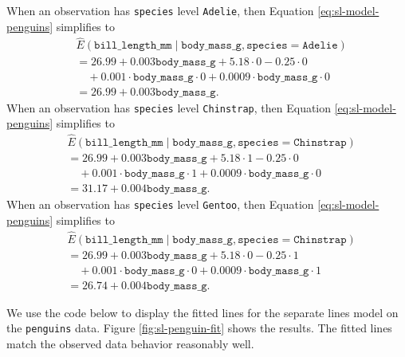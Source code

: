 \documentclass[
]{book}
\theoremstyle{definition}
\theoremstyle{definition}
\theoremstyle{definition}
\theoremstyle{definition}
\theoremstyle{remark}
\begin{document}
When an observation has \texttt{species} level \texttt{Adelie}, then Equation \eqref{eq:sl-model-penguins} simplifies to
\[
\begin{aligned}
&\hat{E}(\mathtt{bill\_length\_mm} \mid \mathtt{body\_mass\_g}, \mathtt{species}=\mathtt{Adelie}) \\
&=26.99 + 0.003 \mathtt{body\_mass\_g} + 5.18 \cdot 0 - 0.25 \cdot 0\\
&\quad + 0.001 \cdot \mathtt{body\_mass\_g} \cdot 0 + 0.0009 \cdot \mathtt{body\_mass\_g} \cdot 0\\
&= 26.99 + 0.003 \mathtt{body\_mass\_g}.
\end{aligned}
\]
When an observation has \texttt{species} level \texttt{Chinstrap}, then Equation \eqref{eq:sl-model-penguins} simplifies to
\[
\begin{aligned}
&\hat{E}(\mathtt{bill\_length\_mm} \mid \mathtt{body\_mass\_g}, \mathtt{species}=\mathtt{Chinstrap}) \\
&=26.99 + 0.003 \mathtt{body\_mass\_g} + 5.18 \cdot 1 - 0.25 \cdot 0 \\
&\quad + 0.001 \cdot \mathtt{body\_mass\_g} \cdot 1 + 0.0009 \cdot \mathtt{body\_mass\_g} \cdot 0 \\
&= 31.17 + 0.004 \mathtt{body\_mass\_g}.
\end{aligned}
\]
When an observation has \texttt{species} level \texttt{Gentoo}, then Equation \eqref{eq:sl-model-penguins} simplifies to
\[
\begin{aligned}
&\hat{E}(\mathtt{bill\_length\_mm} \mid \mathtt{body\_mass\_g}, \mathtt{species}=\mathtt{Chinstrap}) \\
&=26.99 + 0.003 \mathtt{body\_mass\_g} + 5.18 \cdot 0 - 0.25 \cdot 1 \\
&\quad + 0.001 \cdot \mathtt{body\_mass\_g} \cdot 0 + 0.0009 \cdot \mathtt{body\_mass\_g} \cdot 1 \\
&= 26.74 + 0.004 \mathtt{body\_mass\_g}.
\end{aligned}
\]

We use the code below to display the fitted lines for the separate lines model on the \texttt{penguins} data. Figure \ref{fig:sl-penguin-fit} shows the results. The fitted lines match the observed data behavior reasonably well.
\end{document}
